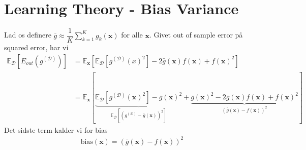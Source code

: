 \documentclass[paper=a4, fontsize=11pt]{scrartcl} %
\numberwithin{equation}{section} %
\numberwithin{figure}{section} %
\numberwithin{table}{section} %
\begin{document}
	\newpage
	
	\section*{Learning Theory - Bias Variance}
	
	Lad os definere $\bar{g}\approx\dfrac{1}{K}\sum_{k=1}^{K}g_k(\mathbf{x})$ for alle $\mathbf{x}$. Givet out of sample error på squared error, har vi
	\begin{align*}
	\mathbb{E}_\mathcal{D}[E_{out}(g^{(\mathcal{D})})] &= \mathbb{E}_\mathbf{x}[\mathbb{E}_\mathcal{D}[g^{(\mathcal{D})}(x)^2]-2\bar{g}(\mathbf{x})f(\mathbf{x})+f(\mathbf{x})^2] \\
	&=\mathbb{E}_\mathbf{x}[\underbrace{\mathbb{E}_\mathcal{D}[g^{(\mathcal{D})}(\mathbf{x})^2]-\bar{g}(\mathbf{x})^2}_{\mathbb{E}_\mathcal{D}[(g^{(\mathcal{D})}-\bar{g}(\mathbf{x}))^2]} + \underbrace{\bar{g}(\mathbf{x})^2-2\bar{g}(\mathbf{x})f(\mathbf{x})+f(\mathbf{x})^2}_{(\bar{g}(\mathbf{x})-f(\mathbf{x}))^2}]  
	\end{align*}
	Det sidste term kalder vi for bias
	\begin{align*}
	\text{bias}(\mathbf{x})=(\bar{g}(\mathbf{x})-f(\mathbf{x}))^2
	\end{align*}
	
	
\end{document}
